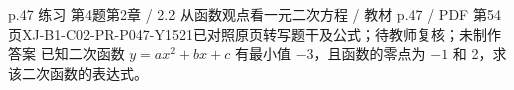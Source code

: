 \par\noindent\begin{minipage}{\linewidth}
\begin{bankitem}{p.47 练习 第4题}{第2章 / 2.2 从函数观点看一元二次方程 / 教材 p.47 / PDF 第54页}{XJ-B1-C02-PR-P047-Y1521}{已对照原页转写题干及公式；待教师复核；未制作答案}
已知二次函数 $y=ax^2+bx+c$ 有最小值 $-3$，且函数的零点为 $-1$ 和 2，求该二次函数的表达式。
\end{bankitem}
\end{minipage}\par\medskip
